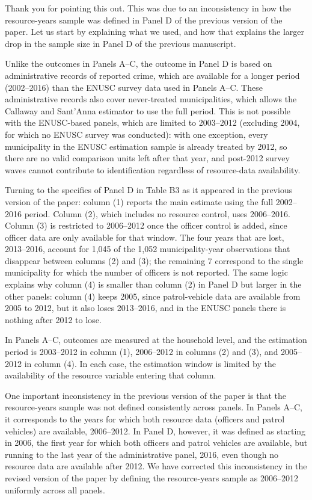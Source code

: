 
Thank you for pointing this out. This was due to an inconsistency in how the resource-years sample was defined in Panel D of the previous version of the paper. Let us start by explaining what we used, and how that explains the larger drop in the sample size in Panel D of the previous manuscript.

Unlike the outcomes in Panels A--C, the outcome in Panel D is based on administrative records of reported crime, which are available for a longer period (2002--2016) than the ENUSC survey data used in Panels A--C. These administrative records also cover never-treated municipalities, which allows the Callaway and Sant'Anna estimator to use the full period. This is not possible with the ENUSC-based panels, which are limited to 2003--2012 (excluding 2004, for which no ENUSC survey was conducted): with one exception, every municipality in the ENUSC estimation sample is already treated by 2012, so there are no valid comparison units left after that year, and post-2012 survey waves cannot contribute to identification regardless of resource-data availability.

Turning to the specifics of Panel D in Table B3 as it appeared in the previous version of the paper: column (1) reports the main estimate using the full 2002--2016 period. Column (2), which includes no resource control, uses 2006--2016. Column (3) is restricted to 2006--2012 once the officer control is added, since officer data are only available for that window. The four years that are lost, 2013--2016, account for 1,045 of the 1,052 municipality-year observations that disappear between columns (2) and (3); the remaining 7 correspond to the single municipality for which the number of officers is not reported. The same logic explains why column (4) is smaller than column (2) in Panel D but larger in the other panels: column (4) keeps 2005, since patrol-vehicle data are available from 2005 to 2012, but it also loses 2013--2016, and in the ENUSC panels there is nothing after 2012 to lose.

In Panels A--C, outcomes are measured at the household level, and the estimation period is 2003--2012 in column (1), 2006--2012 in columns (2) and (3), and 2005--2012 in column (4). In each case, the estimation window is limited by the availability of the resource variable entering that column.

One important inconsistency in the previous version of the paper is that the resource-years sample was not defined consistently across panels. In Panels A--C, it corresponds to the years for which both resource data (officers and patrol vehicles) are available, 2006--2012. In Panel D, however, it was defined as starting in 2006, the first year for which both officers and patrol vehicles are available, but running to the last year of the administrative panel, 2016, even though no resource data are available after 2012. We have corrected this inconsistency in the revised version of the paper by defining the resource-years sample as 2006--2012 uniformly across all panels.

